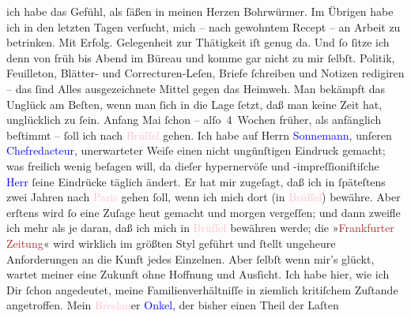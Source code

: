                ich habe das Gefühl, als ſäßen in meinen Herzen \label{T_L02661-1v}\label{T_L02661-1h} Bohrwürmer.\pend
           \pstart
           Im Übrigen habe ich in den letzten Tagen verſucht, mich – nach gewohntem Recept – an
               Arbeit zu betrinken. Mit Erfolg. Gelegenheit zur Thätigkeit iſt genug da. Und ſo
               ſitze ich denn von früh bis Abend im Büreau und komme  gar nicht zu mir ſelbſt. Politik, Feuilleton, Blätter- und
               Correcturen-Leſen, Briefe ſchreiben und Notizen redigiren – {\pb}das ſind Alles ausgezeichnete Mittel gegen das
               Heimweh. Man bekämpft das Unglück am Beſten, wenn man ſich in die Lage ſetzt, daß man
               keine Zeit hat, unglücklich zu ſein. Anfang Mai ſchon –
               alſo 4 Wochen früher, als anfänglich beſtimmt – ſoll ich nach \textcolor{pink}{Brüſſel}{}\ledrightnote{\textcolor{pink}{Brüssel}} gehen. Ich habe auf Herrn \textcolor{blue}{Sonnemann}{}\ledrightnote{\textcolor{blue}{Leopold Sonnemann}}, unſeren \textcolor{blue}{Chefredacteur}{}, unerwarteter Weiſe einen nicht ungünſtigen
               Eindruck gemacht; was freilich wenig beſagen will, da dieſer hypernervöſe und
               -impreſſioniſtiſche \textcolor{blue}{Herr}{}
               ſeine Eindrücke täglich ändert. Er hat mir zugeſagt, daß ich in ſpäteſtens zwei
               Jahren nach \textcolor{pink}{Paris}{}\ledrightnote{\textcolor{pink}{Paris}} gehen ſoll, wenn ich mich dort
               (in \textcolor{pink}{Brüſſel}{}\ledrightnote{\textcolor{pink}{Brüssel}}) bewähre. Aber erſtens wird ſo eine
               Zuſage heut gemacht und morgen vergeſſen; und dann zweifle ich mehr als je daran, daß
               ich mich in \textcolor{pink}{Brüſſel}{}\ledrightnote{\textcolor{pink}{Brüssel}} bewähren {\pb}werde; die »\textcolor{brown}{Frankfurter Zeitung}{}\ledrightnote{\textcolor{brown}{Frankfurter Zeitung}}« wird wirklich im größten Styl geführt und ſtellt
               ungeheure Anforderungen an die Kunft jedes Einzelnen. Aber ſelbſt wenn mir’s glückt,
               wartet meiner eine Zukunft ohne Hoffnung und Ausſicht. Ich habe hier, wie ich Dir
               ſchon angedeutet, meine Familienverhältniſſe in ziemlich kritiſchem Zuſtande
               angetroffen. Mein \textcolor{pink}{Breslau}{}\ledrightnote{\textcolor{pink}{Breslau}}er \textcolor{blue}{Onkel}{}, der bisher einen Theil der Laſten
